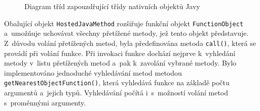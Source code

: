 \begin{figure}[H]
  \begin{center}
    \caption{Diagram tříd zapouzdřující třídy nativních objektů Javy}
    \label{Figure.HostedJavaObject}
  \end{center}
\end{figure}

\vspace{-1em}

Obalující objekt \texttt{HostedJavaMethod} rozšiřuje funkční objekt \texttt{FunctionObject} a~umožňuje uchovávat všechny přetížené metody, jež tento objekt představuje. Z~důvodu volání přetížených metod, byla předefinována metoda \texttt{call()}, která se provádí při volání funkce. Při invokaci funkce dochází nejprve k~vyhledání metody v~listu přetížených metod a~pak k~zavolání vybrané metody. Bylo implementováno jednoduché vyhledávání metod metodou \texttt{getNearestObjectFunction()}, která vyhledává funkce na základě počtu argumentů a~jejich typů. Vyhledávání počítá i~s~možností volání metod s~proměnnými argumenty.

